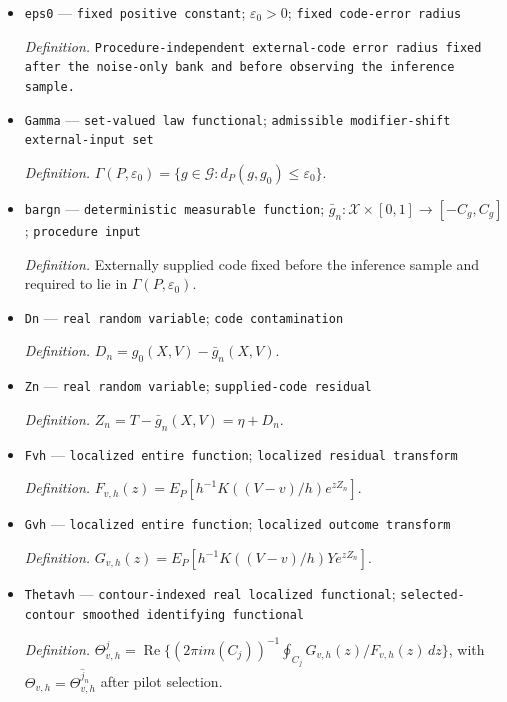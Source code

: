 \documentclass{article}
\begin{document}
\begin{itemize}
  \item \texttt{eps0} --- \texttt{fixed positive constant}; \(\varepsilon_0>0\); \texttt{fixed code-\allowbreak{}error radius}
  \par\smallskip\noindent\emph{Definition.} \texttt{Procedure-\allowbreak{}independent external-\allowbreak{}code error radius fixed after the noise-\allowbreak{}only bank and before observing the inference sample.}
  \item \texttt{Gamma} --- \texttt{set-\allowbreak{}valued law functional}; \texttt{admissible modifier-\allowbreak{}shift external-\allowbreak{}input set}
  \par\smallskip\noindent\emph{Definition.} \(\Gamma(P,\varepsilon_0)=\{g\in\mathcal G:d_P(g,g_0)\le\varepsilon_0\}\).
  \item \texttt{bargn} --- \texttt{deterministic measurable function}; \(\bar g_n:\mathcal X\times[0,1]\to[-C_g,C_g]\); \texttt{procedure input}
  \par\smallskip\noindent\emph{Definition.} Externally supplied code fixed before the inference sample and required to lie in \(\Gamma(P,\varepsilon_0)\).
  \item \texttt{Dn} --- \texttt{real random variable}; \texttt{code contamination}
  \par\smallskip\noindent\emph{Definition.} \(D_n=g_0(X,V)-\bar g_n(X,V)\).
  \item \texttt{Zn} --- \texttt{real random variable}; \texttt{supplied-\allowbreak{}code residual}
  \par\smallskip\noindent\emph{Definition.} \(Z_n=T-\bar g_n(X,V)=\eta+D_n\).
  \item \texttt{Fvh} --- \texttt{localized entire function}; \texttt{localized residual transform}
  \par\smallskip\noindent\emph{Definition.} \(F_{v,h}(z)=E_P[h^{-1}K((V-v)/h)e^{zZ_n}]\).
  \item \texttt{Gvh} --- \texttt{localized entire function}; \texttt{localized outcome transform}
  \par\smallskip\noindent\emph{Definition.} \(G_{v,h}(z)=E_P[h^{-1}K((V-v)/h)Ye^{zZ_n}]\).
  \item \texttt{Thetavh} --- \texttt{contour-\allowbreak{}indexed real localized functional}; \texttt{selected-\allowbreak{}contour smoothed identifying functional}
  \par\smallskip\noindent\emph{Definition.} \(\Theta^j_{v,h}=\operatorname{Re}\{(2\pi i m(C_j))^{-1}\oint_{C_j}G_{v,h}(z)/F_{v,h}(z)\,dz\}\), with \(\Theta_{v,h}=\Theta^{\widehat j_n}_{v,h}\) after pilot selection.

\end{itemize}
\end{document}
